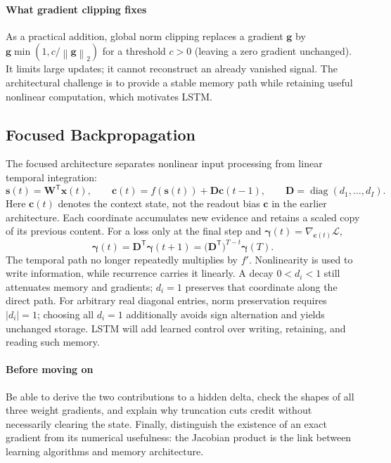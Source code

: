 \documentclass[11pt, oneside]{book}
\newcommand{\norm}[1]{\left\lVert #1 \right\rVert}
\newcommand{\T}{^{\mathsf{T}}}           %
\newcommand{\diag}{\operatorname{diag}}
\newcommand{\loss}{\mathcal{L}}          %
\newcommand{\params}{\boldsymbol{\theta}}   %
\let\originalsubsection\subsection
\renewcommand{\subsection}{\Needspace{6\baselineskip}\originalsubsection}
\begin{document}
\paragraph{What gradient clipping fixes} As a practical addition, global norm clipping replaces a gradient $\mathbf{g}$ by $\mathbf{g}\min(1,c/\norm{\mathbf{g}}_2)$ for a threshold $c>0$ (leaving a zero gradient unchanged). It limits large updates; it cannot reconstruct an already vanished signal. The architectural challenge is to provide a stable memory path while retaining useful nonlinear computation, which motivates LSTM.

\subsection{Focused Backpropagation}\label{sec:source-2-5-3}
The focused architecture separates nonlinear input processing from linear temporal integration:
\[
 \mathbf{s}(t)=\mathbf{W}\T\mathbf{x}(t),\qquad
 \mathbf{c}(t)=f(\mathbf{s}(t))+\mathbf{D}\mathbf{c}(t-1),
 \qquad \mathbf{D}=\diag(d_1,\ldots,d_I).
\]
Here $\mathbf{c}(t)$ denotes the context state, not the readout bias $\mathbf{c}$ in the earlier architecture. Each coordinate accumulates new evidence and retains a scaled copy of its previous content. For a loss only at the final step and $\boldsymbol{\gamma}(t)=\nabla_{\mathbf{c}(t)}\loss$,
\[
 \boldsymbol{\gamma}(t)=\mathbf{D}\T\boldsymbol{\gamma}(t+1)
 =\bigl(\mathbf{D}\T\bigr)^{T-t}\boldsymbol{\gamma}(T).
\]
The temporal path no longer repeatedly multiplies by $f'$. Nonlinearity is used to write information, while recurrence carries it linearly. A decay $0<d_i<1$ still attenuates memory and gradients; $d_i=1$ preserves that coordinate along the direct path. For arbitrary real diagonal entries, norm preservation requires $|d_i|=1$; choosing all $d_i=1$ additionally avoids sign alternation and yields unchanged storage. LSTM will add learned control over writing, retaining, and reading such memory.

\paragraph{Before moving on} Be able to derive the two contributions to a hidden delta, check the shapes of all three weight gradients, and explain why truncation cuts credit without necessarily clearing the state. Finally, distinguish the existence of an exact gradient from its numerical usefulness: the Jacobian product is the link between learning algorithms and memory architecture.
\end{document}
